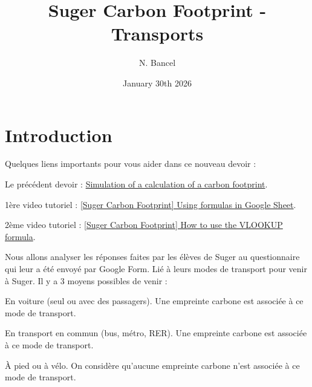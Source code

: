 \documentclass{exam}
\title{Suger Carbon Footprint - Transports}
\author{N. Bancel}
\date{January 30th 2026}
\begin{document}
{\let\newpage\relax\maketitle}

\section{Introduction}

\begin{Indication}
  Quelques liens importants pour vous aider dans ce nouveau devoir : 
  \begin{compactitem}
    \item Le précédent devoir : \href{https://docs.google.com/spreadsheets/d/1dNwbzpJt8uUCMYMr-9A3AGU0R27vBdNBqc6oD62n8s8/edit?gid=2097997664#gid=2097997664}{Simulation of a calculation of a carbon footprint}.
    \item 1ère video tutoriel : \href{https://www.loom.com/share/36719b97cfb243b8a52dcccf79004bbb}{[Suger Carbon Footprint] Using formulas in Google Sheet}.
    \item 2ème video tutoriel : \href{https://www.loom.com/share/cb344bfb182c4cf0b42e95f2e58bca24}{[Suger Carbon Footprint] How to use the VLOOKUP formula}.
  \end{compactitem}

  \vspace{1em}

  Nous allons analyser les réponses faites par les élèves de Suger au questionnaire qui leur a été envoyé par Google Form. Lié à leurs modes de transport pour venir à Suger. Il y a 3 moyens possibles de venir : 
\begin{compactitem}
  \item En voiture (seul ou avec des passagers). Une empreinte carbone est associée à ce mode de transport.
  \item En transport en commun (bus, métro, RER). Une empreinte carbone est associée à ce mode de transport.
  \item À pied ou à vélo. On considère qu'aucune empreinte carbone n'est associée à ce mode de transport.
\end{compactitem}
\end{Indication}
\end{document}
